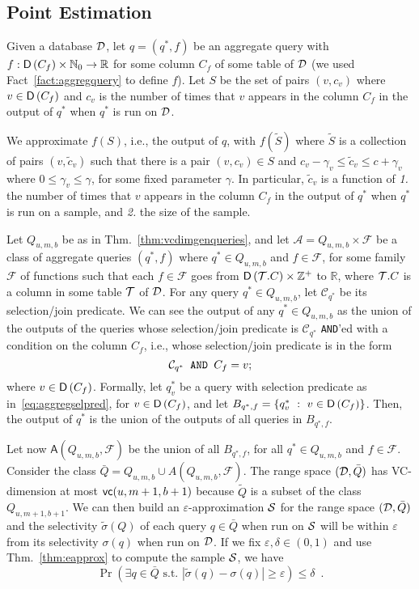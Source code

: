 \subsection{Point Estimation}\label{sec:pointest}
Given a database ${\cal D}$, let $q=(q^*,f)$ be an aggregate query with
$f:\mathsf{D}\left(C_f\right)\times\mathbb{N}_0\to\mathbb{R}$ for some column $C_f$ of some
table of ${\cal D}$ (we used Fact~\ref{fact:aggregquery} to define $f$). Let $S$ be the
set of pairs $(v,c_v)$ where $v\in \mathsf{D}\left(C_f\right)$ and $c_v$ is the number of times
that $v$ appears in the column $C_f$ in the output of $q^*$ when $q^*$ is run on
${\cal D}$.

We approximate $f(S)$, i.e., the output of $q$, with $f(\tilde{S})$ where
$\tilde{S}$ is a collection of pairs $(v,\tilde{c}_v)$ such that there is a pair
$(v,c_v)\in S$ and $c_v-\gamma_v \le\tilde{c}_v\le c+\gamma_v$ where $0\le
\gamma_v \le \gamma$, for some fixed parameter $\gamma$. In particular,
$\tilde{c}_v$ is a function of \emph{1.} the number of times that $v$ appears in the
column $C_f$ in the output of $q^*$ when $q^*$ is run on a sample, and \emph{2.}
the size of the sample.

Let $Q_{u,m,b}$ be as in Thm.~\ref{thm:vcdimgenqueries}, and let
$\mathcal{A}=Q_{u,m,b}\times\mathcal{F}$  be a class of aggregate queries $(q^*,f)$
where $q^*\in Q_{u,m,b}$ and $f\in\mathcal{F}$, for some family $\mathcal{F}$ of
functions such that each $f\in\mathcal{F}$ goes from
$\mathsf{D}\left({\cal T}.C\right)\times\mathbb{Z}^+$ to $\mathbb{R}$, where ${\cal T}.C$ is a column
in some table ${\cal T}$ of ${\cal D}$. For any query $q^*\in Q_{u,m,b}$, let
$\mathcal{C}_{q^*}$ be its selection/join predicate.
We can see the output of any $q^*\in Q_{u,m,b}$ as the union of the
outputs of the queries whose selection/join predicate is $\mathcal{C}_{q^*}$
\texttt{AND}'ed with a condition on the column $C_f$, i.e., whose selection/join
predicate is in the form
\begin{equation}\label{eq:aggregselpred}
  \mathcal{C}_{q^*} \mbox{\texttt{ AND }} C_f=v;
\end{equation}
where $v\in\mathsf{D}\left(C_f\right)$. Formally, let $q^*_v$ be a query with selection
predicate as in~\eqref{eq:aggregselpred}, for $v\in\mathsf{D}\left(C_f\right)$, and let
$B_{q^*,f}=\{q^*_v ~:~ v\in\mathsf{D}\left(C_f\right)\}$. Then, the output of $q^*$ is the union of the
outputs of all queries in $B_{q^*,f}$.

Let now $\mathsf{A}(Q_{u,m,b},\mathcal{F})$ be the union of all $B_{q^*,f}$, for
all $q^*\in Q_{u,m,b}$ and $f\in\mathcal{F}$. Consider the class
$\bar{Q}=Q_{u,m,b}\cup A(Q_{u,m,b},\mathcal{F})$. The range space $({\cal D},\bar{Q})$ has
VC-dimension at most $\mathsf{vc}(u,m+1,b+1)$ because $\tilde{Q}$ is a subset of the
class $Q_{u,m+1,b+1}$. We can then build an $\varepsilon$-approximation ${\cal S}$ for
the range space $({\cal D},\bar{Q})$ and the selectivity $\tilde\sigma(Q)$ of each query
$q\in\bar{Q}$ when run on ${\cal S}$ will be within $\varepsilon$ from its
selectivity $\sigma(q)$ when run on ${\cal D}$. If we fix
$\varepsilon,\delta\in(0,1)$ and use Thm.~\ref{thm:eapprox} to
compute the sample ${\cal S}$, we have
\[
\Pr(\exists q\in\bar{Q} \mbox{ s.t. }
|\tilde\sigma(q)-\sigma(q)|\ge\varepsilon)\le\delta\enspace.
\]

